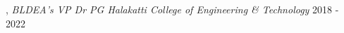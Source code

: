, \textit{BLDEA’s VP Dr PG Halakatti College of Engineering \& Technology}	\hfill {\color{highlight} 2018 - 2022}
